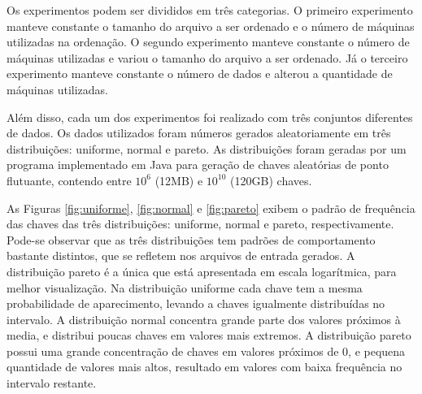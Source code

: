 Os experimentos podem ser divididos em três categorias. O primeiro experimento manteve constante o tamanho do arquivo a ser ordenado e o número de máquinas utilizadas na ordenação. O segundo experimento manteve constante o número de máquinas utilizadas e variou o tamanho do arquivo a ser ordenado. Já o terceiro experimento manteve constante o número de dados e alterou a quantidade de máquinas utilizadas. 


 Além disso, cada um dos experimentos foi realizado com três conjuntos diferentes de dados.
Os dados utilizados foram números gerados aleatoriamente em três distribuições: uniforme, normal e pareto. As distribuições foram geradas por um programa implementado em Java para geração de chaves aleatórias de ponto flutuante, contendo entre $10^{6}$ (12MB) e  $10^{10}$ (120GB) chaves. 

As Figuras \ref{fig:uniforme}, \ref{fig:normal} e \ref{fig:pareto} exibem o padrão de frequência das chaves das três distribuições: uniforme, normal e pareto, respectivamente. 
Pode-se observar que as três distribuições tem padrões de comportamento bastante distintos, que se refletem nos arquivos de entrada gerados. A distribuição pareto é a única que está apresentada em escala logarítmica, para melhor visualização. 
Na distribuição uniforme cada chave tem a mesma probabilidade de aparecimento, levando a chaves igualmente distribuídas no intervalo. A distribuição normal concentra grande parte dos valores próximos à media, e distribui poucas chaves em valores mais extremos. A distribuição pareto possui uma grande concentração de chaves em valores próximos de 0, e pequena quantidade de valores mais altos, resultado em valores com baixa frequência no intervalo restante. %

